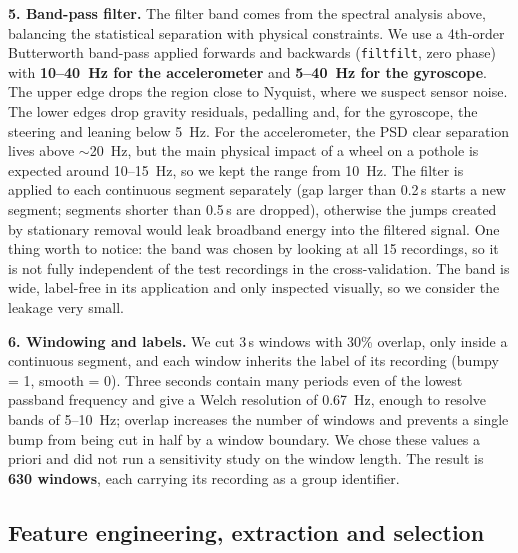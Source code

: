 \documentclass[10pt,a4paper]{article}
\begin{document}
\textbf{5. Band-pass filter.} The filter band comes from the spectral analysis above, balancing the statistical separation with physical constraints. We use a 4th-order Butterworth band-pass applied forwards and backwards (\texttt{filtfilt}, zero phase) with \textbf{10--40~Hz for the accelerometer} and \textbf{5--40~Hz for the gyroscope}. The upper edge drops the region close to Nyquist, where we suspect sensor noise. The lower edges drop gravity residuals, pedalling and, for the gyroscope, the steering and leaning below 5~Hz. For the accelerometer, the PSD clear separation lives above $\sim$20~Hz, but the main physical impact of a wheel on a pothole is expected around 10--15~Hz, so we kept the range from 10~Hz. The filter is applied to each continuous segment separately (gap larger than 0.2\,s starts a new segment; segments shorter than 0.5\,s are dropped), otherwise the jumps created by stationary removal would leak broadband energy into the filtered signal. One thing worth to notice: the band was chosen by looking at all 15 recordings, so it is not fully independent of the test recordings in the cross-validation. The band is wide, label-free in its application and only inspected visually, so we consider the leakage very small.

\textbf{6. Windowing and labels.} We cut 3\,s windows with 30\% overlap, only inside a continuous segment, and each window inherits the label of its recording (bumpy = 1, smooth = 0). Three seconds contain many periods even of the lowest passband frequency and give a Welch resolution of 0.67~Hz, enough to resolve bands of 5--10~Hz; overlap increases the number of windows and prevents a single bump from being cut in half by a window boundary. We chose these values a priori and did not run a sensitivity study on the window length. The result is \textbf{630 windows}, each carrying its recording as a group identifier.

\subsection{Feature engineering, extraction and selection}
\end{document}
